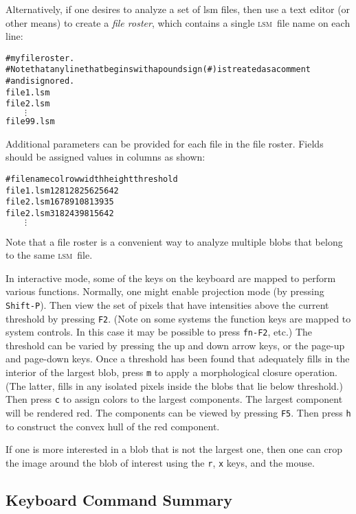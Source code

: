 \documentclass[10pt]{article}
\newcommand{\LSM}{\textsc{lsm}}
\begin{document}
Alternatively, if one desires to analyze a set of lsm files, then use a text editor (or other means)
to create a \emph{file roster}, which contains a single \LSM\ file name on each line:

\begin{center}
\begin{alltt}
# my file roster.
# Note that any line that begins with a pound sign (#) is treated as a comment
# and is ignored.
file1.lsm
file2.lsm
\(\qquad\vdots\)
file99.lsm
\end{alltt}
\end{center}

Additional parameters can be provided for each file in the file roster. Fields should
be assigned values in columns as shown:
\begin{center}
\begin{alltt}
# filename   col   row     width    height   threshold  
file1.lsm    128   128      256      256       42       
file2.lsm    167    89      108      139       35       
file2.lsm    318   243       98      156       42       
\(\qquad\vdots\)
\end{alltt}
\end{center}
Note that a file roster is a convenient way to analyze multiple blobs that belong to the same \LSM\ file.

In interactive mode, some of the keys on the keyboard are mapped to perform various functions.
Normally, one might enable projection mode (by pressing {\tt Shift-P}). Then view the set of pixels
that have intensities above the current threshold by pressing {\tt F2}. (Note on some systems the function
keys are mapped to system controls. In this case it may be possible to press {\tt fn-F2}, etc.)
The threshold can be varied by pressing the up and down arrow keys, or the page-up and page-down keys.
Once a threshold has been found that adequately fills in the interior of the largest blob, press {\tt m}
to apply a morphological closure operation. (The latter, fills in any isolated pixels inside the blobs
that lie below threshold.) Then press {\tt c} to assign colors to the largest components. The largest component
will be rendered red. The components can be viewed by pressing {\tt F5}. Then press {\tt h} to
construct the convex hull of the red component.

If one is more interested in a blob that is not the largest one, then one can crop the image around the blob
of interest using the {\tt r}, {\tt x} keys,
and the mouse.

\subsection{Keyboard Command Summary}
\end{document}
